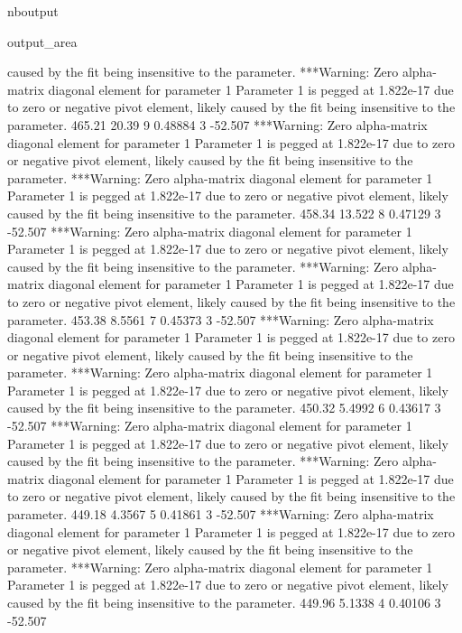 \documentclass[letterpaper,10pt,english]{sphinxmanual}
\begin{document}
\begin{sphinxuseclass}{nboutput}
{\begin{sphinxuseclass}{output_area}
\begin{sphinxuseclass}{}
\begin{sphinxVerbatim}[commandchars=\\\{\}]
 caused by the fit being insensitive to the parameter.
***Warning: Zero alpha-matrix diagonal element for parameter 1
 Parameter 1 is pegged at 1.822e-17 due to zero or negative pivot element, likely
 caused by the fit being insensitive to the parameter.
          465.21       20.39    9     0.48884    3     -52.507
***Warning: Zero alpha-matrix diagonal element for parameter 1
 Parameter 1 is pegged at 1.822e-17 due to zero or negative pivot element, likely
 caused by the fit being insensitive to the parameter.
***Warning: Zero alpha-matrix diagonal element for parameter 1
 Parameter 1 is pegged at 1.822e-17 due to zero or negative pivot element, likely
 caused by the fit being insensitive to the parameter.
          458.34      13.522    8     0.47129    3     -52.507
***Warning: Zero alpha-matrix diagonal element for parameter 1
 Parameter 1 is pegged at 1.822e-17 due to zero or negative pivot element, likely
 caused by the fit being insensitive to the parameter.
***Warning: Zero alpha-matrix diagonal element for parameter 1
 Parameter 1 is pegged at 1.822e-17 due to zero or negative pivot element, likely
 caused by the fit being insensitive to the parameter.
          453.38      8.5561    7     0.45373    3     -52.507
***Warning: Zero alpha-matrix diagonal element for parameter 1
 Parameter 1 is pegged at 1.822e-17 due to zero or negative pivot element, likely
 caused by the fit being insensitive to the parameter.
***Warning: Zero alpha-matrix diagonal element for parameter 1
 Parameter 1 is pegged at 1.822e-17 due to zero or negative pivot element, likely
 caused by the fit being insensitive to the parameter.
          450.32      5.4992    6     0.43617    3     -52.507
***Warning: Zero alpha-matrix diagonal element for parameter 1
 Parameter 1 is pegged at 1.822e-17 due to zero or negative pivot element, likely
 caused by the fit being insensitive to the parameter.
***Warning: Zero alpha-matrix diagonal element for parameter 1
 Parameter 1 is pegged at 1.822e-17 due to zero or negative pivot element, likely
 caused by the fit being insensitive to the parameter.
          449.18      4.3567    5     0.41861    3     -52.507
***Warning: Zero alpha-matrix diagonal element for parameter 1
 Parameter 1 is pegged at 1.822e-17 due to zero or negative pivot element, likely
 caused by the fit being insensitive to the parameter.
***Warning: Zero alpha-matrix diagonal element for parameter 1
 Parameter 1 is pegged at 1.822e-17 due to zero or negative pivot element, likely
 caused by the fit being insensitive to the parameter.
          449.96      5.1338    4     0.40106    3     -52.507

\end{sphinxVerbatim}
\end{sphinxuseclass}
\end{sphinxuseclass}}
\end{sphinxuseclass}
\end{document}
